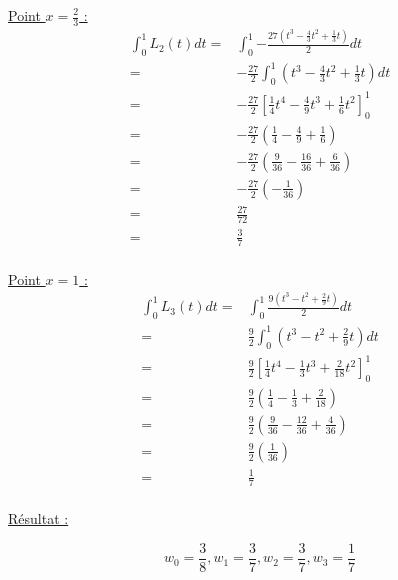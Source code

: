\documentclass{article}
\begin{document}
\begin{enumerate}
\underline{Point $x = \frac{2}{3}$ :}
\begin{equation*}
  \begin{split}
    \int_0^1 {L_2(t) dt} = & \int_0^1 {- \frac{27 (t^3 - \frac{4}{3}t^2 + \frac{1}{3}t)}
    {2} dt }
    \\
    = & - \frac{27}{2} \int_0^1 { \left( t^3 - \frac{4}{3}t^2 +
      \frac{1}{3}t \right) dt }
    \\
    = & - \frac{27}{2} \left[ \frac{1}{4}t^4 - \frac{4}{9}t^3 +
      \frac{1}{6}t^2 \right]_0^1
    \\
    = & - \frac{27}{2} \left( \frac{1}{4} - \frac{4}{9} + \frac{1}{6} \right) 
    \\
    = & - \frac{27}{2} \left( \frac{9}{36} - \frac{16}{36} +
    \frac{6}{36} \right)
    \\
    = & - \frac{27}{2} \left( - \frac{1}{36} \right) 
    \\
    = & \frac{27}{72}
    \\
    = & \frac{3}{7}
    \\
  \end{split}
\end{equation*}

\underline{Point $x = 1$ :}
\begin{equation*}
  \begin{split}
    \int_0^1 {L_3(t) dt} = & \int_0^1 {\frac{ 9 (t^3 - t^2 + \frac{2}{9} t)}
    {2} dt}
    \\
    = & \frac{9}{2} \int_0^1 { \left(t^3 - t^2 + \frac{2}{9} t \right) dt}
    \\
    = & \frac{9}{2} \left[ \frac{1}{4}t^4 - \frac{1}{3}t^3 +
      \frac{2}{18} t^2 \right]_0^1
    \\
    = & \frac{9}{2} \left(\frac{1}{4} - \frac{1}{3} +
      \frac{2}{18} \right)
    \\
    = & \frac{9}{2} \left( \frac{9}{36} - \frac{12}{36} +
      \frac{4}{36} \right)
    \\
    = & \frac{9}{2} \left( \frac{1}{36} \right)
    \\
    = & \frac{1}{7}
    \\
  \end{split}
\end{equation*}

\underline{Résultat :}

\begin{equation*}
    w_0 = \frac{3}{8},
    w_1 = \frac{3}{7},
    w_2 = \frac{3}{7},
    w_3 = \frac{1}{7}
\end{equation*}


\end{enumerate}
\end{document}
